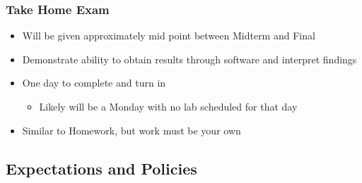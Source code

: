 \documentclass[
  letterpaper,
  DIV=11,
  numbers=noendperiod]{scrartcl}
\providecommand{\tightlist}{%
  \setlength{\itemsep}{0pt}\setlength{\parskip}{0pt}}\usepackage{longtable,booktabs,array}
\begin{document}
\hypertarget{take-home-exam}{%
\subsubsection{Take Home Exam}\label{take-home-exam}}

\begin{itemize}
\tightlist
\item
  Will be given approximately mid point between Midterm and Final
\item
  Demonstrate ability to obtain results through software and interpret
  findings
\item
  One day to complete and turn in

  \begin{itemize}
  \tightlist
  \item
    Likely will be a Monday with no lab scheduled for that day
  \end{itemize}
\item
  Similar to Homework, but work must be your own
\end{itemize}

\hypertarget{expectations-and-policies}{%
\subsection{Expectations and Policies}\label{expectations-and-policies}}
\end{document}
